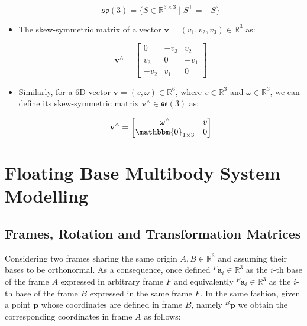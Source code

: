 \begin{itemize}
          \begin{equation}
              \mathfrak{so}(3) = \{S \in \mathbb{R}^{3\times3} \mid S^\top = -S \}
          \end{equation}

    \item The skew-symmetric matrix of a vector $\mathbf{v} = (v_1, v_2, v_3) \in \mathbb{R}^3$ as:

          \begin{equation}
              \mathbf{v} ^\wedge = \begin{bmatrix}
                  0    & -v_3 & v_2  \\
                  v_3  & 0    & -v_1 \\
                  -v_2 & v_1  & 0
              \end{bmatrix}
          \end{equation}

    \item Similarly, for a $6$D vector $\mathbf{v} = (v, \omega) \in \mathbb{R}^6$, where $v \in \mathbb{R}^3$ and $\omega \in \mathbb{R}^3$, we can define its skew-symmetric matrix $\mathbf{v} ^\wedge \in \mathfrak{se}(3)$ as:

          \begin{equation}
              \mathbf{v} ^\wedge = \begin{bmatrix}
                  \omega ^\wedge            & v \\
                  \mathbbm{0} _{1 \times 3} & 0
              \end{bmatrix}
          \end{equation}
\end{itemize}

\section{Floating Base Multibody System Modelling}

\subsection{Frames, Rotation and Transformation Matrices}

Considering two frames sharing the same origin $A, B \in \mathbb{R}^3$ and assuming their bases to be orthonormal. As a consequence, once defined ${}^F\mathbf{a} _i \in \mathbb{R}^3$ as the $i$-th base of the frame $A$ expressed in arbitrary frame $F$ and equivalently ${}^F\mathbf{a} _i \in \mathbb{R}^3$ as the $i$-th base of the frame $B$ expressed in the same frame $F$. In the same fashion, given a point $\mathbf{p}$ whose coordinates are defined in frame $B$, namely ${}^B\mathbf{p}$ we obtain the corresponding coordinates in frame $A$ as follows:

